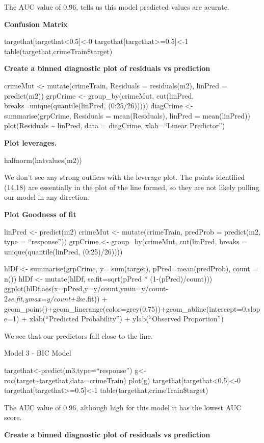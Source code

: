 \documentclass[
]{article}
\begin{document}
The AUC value of 0.96, tells us this model predicted values are acurate.

\textbf{Confusion Matrix}

targethat{[}targethat\textless0.5{]}\textless-0
targethat{[}targethat\textgreater=0.5{]}\textless-1
table(targethat,crimeTrain\$target)

\textbf{Create a binned diagnostic plot of residuals vs prediction}

crimeMut \textless- mutate(crimeTrain, Residuals = residuals(m2),
linPred = predict(m2)) grpCrime \textless- group\_by(crimeMut,
cut(linPred, breaks=unique(quantile(linPred, (0:25/26))))) diagCrime
\textless- summarise(grpCrime, Residuals = mean(Residuals), linPred =
mean(linPred)) plot(Residuals \textasciitilde{} linPred, data =
diagCrime, xlab=``Linear Predictor'')

\textbf{Plot leverages.}

halfnorm(hatvalues(m2))

We don't see any strong outliers with the leverage plot. The points
identified (14,18) are essentially in the plot of the line formed, so
they are not likely pulling our model in any direction.

\textbf{Plot Goodness of fit}

linPred \textless- predict(m2) crimeMut \textless- mutate(crimeTrain,
predProb = predict(m2, type = ``response'')) grpCrime \textless-
group\_by(crimeMut, cut(linPred, breaks = unique(quantile(linPred,
(0:25)/26))))

hlDf \textless- summarise(grpCrime, y= sum(target),
pPred=mean(predProb), count = n()) hlDf \textless- mutate(hlDf,
se.fit=sqrt(pPred * (1-(pPred)/count)))
ggplot(hlDf,aes(x=pPred,y=y/count,ymin=y/count-2\emph{se.fit,ymax=y/count+2}se.fit))
+
geom\_point()+geom\_linerange(color=grey(0.75))+geom\_abline(intercept=0,slope=1)
+ xlab(``Predicted Probability'') + ylab(``Observed Proportion'')

We see that our predictors fall close to the line.

Model 3 - BIC Model

targethat\textless-predict(m3,type=``response'')
g\textless-roc(target\textasciitilde targethat,data=crimeTrain) plot(g)
targethat{[}targethat\textless0.5{]}\textless-0
targethat{[}targethat\textgreater=0.5{]}\textless-1
table(targethat,crimeTrain\$target)

The AUC value of 0.96, although high for this model it has the lowest
AUC score.

\textbf{Create a binned diagnostic plot of residuals vs prediction}
\end{document}
